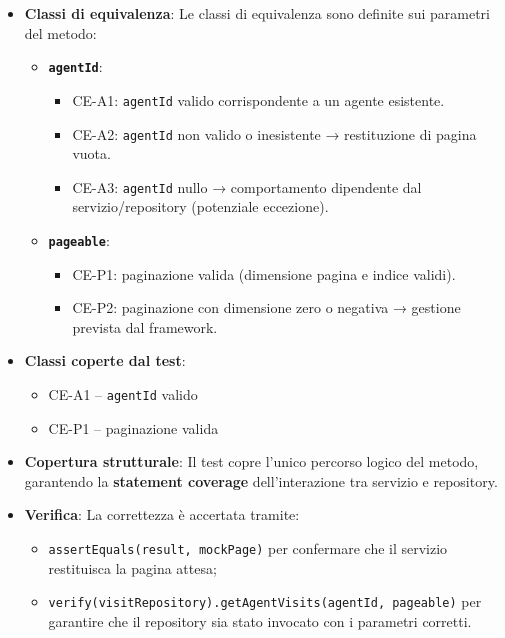 \documentclass{book}
\begin{document}
\begin{itemize}

\item \textbf{Classi di equivalenza}: 
Le classi di equivalenza sono definite sui parametri del metodo:

\begin{itemize}
    \item \textbf{\texttt{agentId}}:
    \begin{itemize}
        \item CE-A1: \texttt{agentId} valido corrispondente a un agente esistente.
        \item CE-A2: \texttt{agentId} non valido o inesistente → restituzione di pagina vuota.
        \item CE-A3: \texttt{agentId} nullo → comportamento dipendente dal servizio/repository (potenziale eccezione).
    \end{itemize}

    \item \textbf{\texttt{pageable}}:
    \begin{itemize}
        \item CE-P1: paginazione valida (dimensione pagina e indice validi).
        \item CE-P2: paginazione con dimensione zero o negativa → gestione prevista dal framework.
    \end{itemize}
\end{itemize}

\item \textbf{Classi coperte dal test}:
\begin{itemize}
    \item CE-A1 – \texttt{agentId} valido
    \item CE-P1 – paginazione valida
\end{itemize}

\item \textbf{Copertura strutturale}:  
Il test copre l’unico percorso logico del metodo, garantendo la \textbf{statement coverage} dell’interazione tra servizio e repository.

\item \textbf{Verifica}:  
La correttezza è accertata tramite:
\begin{itemize}
    \item \texttt{assertEquals(result, mockPage)} per confermare che il servizio restituisca la pagina attesa;
    \item \texttt{verify(visitRepository).getAgentVisits(agentId, pageable)} per garantire che il repository sia stato invocato con i parametri corretti.
\end{itemize}

\end{itemize}
\clearpage
\end{document}
